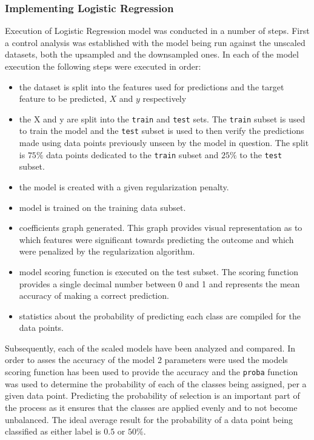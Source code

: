 \subsubsection{Implementing Logistic Regression}\label{sec:exec:log-reg}

Execution of Logistic Regression model was conducted in a number of steps. First a control analysis was established with the model being run against the unscaled datasets, both the upsampled and the downsampled ones. In each of the model execution the following steps were executed in order:
\begin{itemize}
    \item the dataset is split into the features used for predictions and the target feature to be predicted, $X$ and $y$ respectively
    \item the X  and y are split into the \texttt{train} and \texttt{test} sets. The \texttt{train} subset is used to train the model and the \texttt{test} subset is used to then verify the predictions made using data points previously unseen by the model in question. The split is $75\%$ data points dedicated to the \texttt{train} subset and $25\%$ to the \texttt{test} subset.
    \item the model is created with a given regularization penalty.
    \item model is trained on the training data subset.
    \item coefficients graph generated. This graph provides visual representation as to which features were significant towards predicting the outcome and which were penalized by the regularization algorithm.
    \item model scoring function is executed on the test subset. The scoring function provides a single decimal number between 0 and 1 and represents the mean accuracy of making a correct prediction. 
    \item statistics about the probability of predicting each class are compiled for the data points.
\end{itemize}

Subsequently, each of the scaled models have been analyzed and compared. In order to asses the accuracy of the model 2 parameters were used the models scoring function has been used to provide the accuracy and the \texttt{proba} function was used to determine the probability of each of the classes being assigned, per a given data point.
Predicting the probability of selection is an important part of the process as it ensures that the classes are applied evenly and to not become unbalanced. The ideal average result for the probability of a data point being classified as either label is $0.5$ or $50\%$.